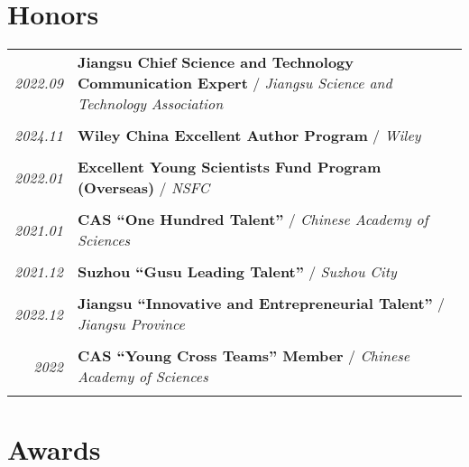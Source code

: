 \documentclass[paper=a4,fontsize=11pt]{scrartcl}
\begin{document}
\section*{Honors}

\begin{tabular}{r|p{11cm}}
	
	\emph{2022.09} & \textbf{Jiangsu Chief Science and Technology Communication Expert} / \emph{Jiangsu Science and Technology Association}\\
	\multicolumn{2}{c}{} \\
	
	\emph{2024.11} & \textbf{Wiley China Excellent Author Program} / \emph{Wiley}\\
	\multicolumn{2}{c}{} \\

	\emph{2022.01} & \textbf{Excellent Young Scientists Fund Program (Overseas)} / \emph{NSFC}\\
	\multicolumn{2}{c}{} \\
	
	\emph{2021.01} & \textbf{CAS ``One Hundred Talent''} / \emph{Chinese Academy of Sciences}\\
	\multicolumn{2}{c}{} \\
	
	
	\emph{2021.12} & \textbf{Suzhou ``Gusu Leading Talent''} / \emph{Suzhou City}\\
	\multicolumn{2}{c}{} \\

	\emph{2022.12} & \textbf{Jiangsu ``Innovative and Entrepreneurial Talent''} / \emph{Jiangsu Province}\\
	\multicolumn{2}{c}{} \\
	
	\emph{2022} & \textbf{CAS ``Young Cross Teams'' Member} / \emph{Chinese Academy of Sciences}\\
	\multicolumn{2}{c}{}
	
	
\end{tabular}


\section*{Awards}
\end{document}

